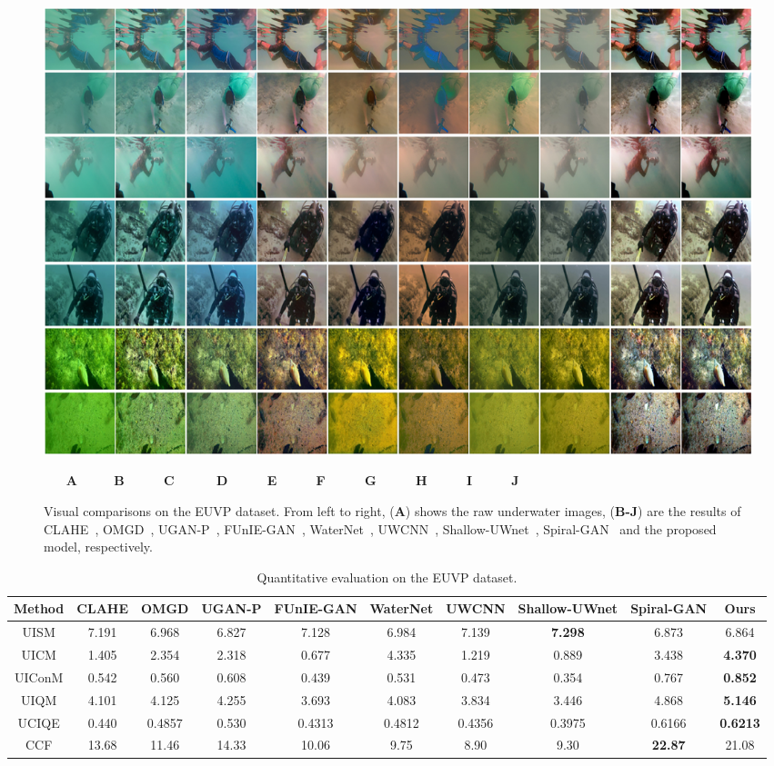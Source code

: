 \documentclass[utf8]{FrontiersinHarvard} %
\begin{document}
\begin{figure}[htbp]
\begin{center}
\includegraphics[width=1\textwidth]{FSpiralGAN_frontiers/onepicture/EUVP300.jpg}
\end{center}
$~~~~~~~~$\textbf{A}$~~~~~~~~~~~~~$\textbf{B}$~~~~~~~~~~~~~~$\textbf{C}$~~~~~~~~~~~~~~~$\textbf{D}$~~~~~~~~~~~~~~$\textbf{E}$~~~~~~~~~~~~~~$\textbf{F}$~~~~~~~~~~~~~~$\textbf{G}$~~~~~~~~~~~~~~$\textbf{H}$~~~~~~~~~~~~~~$\textbf{I}$~~~~~~~~~~~~~~$\textbf{J}
 \caption{{Visual comparisons on the EUVP dataset. From left to right, (\textbf{A}) shows the raw underwater images, (\textbf{B-J}) are the results of CLAHE~\citep{109340}, OMGD~\citep{ren2021online}, UGAN-P~\citep{8460552}, FUnIE-GAN~\citep{9001231}, WaterNet~\citep{8917818}, UWCNN~\citep{2019Underwater1}, Shallow-UWnet~\citep{naik2021shallow}, Spiral-GAN~\citep{2020Underwater} and the proposed model, respectively.}\label{fig:comparison-fgan}}
\end{figure}

\begin{table}[htbp]\small
\centering
\setlength\tabcolsep{3pt}
\caption{{Quantitative evaluation on the EUVP dataset.}}
\begin{tabular}{c|ccccccccc}
\hline  
Method&CLAHE&OMGD&UGAN-P&FUnIE-GAN&WaterNet&UWCNN&Shallow-UWnet&Spiral-GAN&Ours\\
\hline 
UISM&7.191&6.968&6.827&7.128&6.984&7.139&\textbf{7.298}&6.873&6.864\\
\hline 
UICM&1.405&2.354&2.318&0.677&4.335&1.219&0.889&3.438&\textbf{4.370}\\
\hline 
UIConM&0.542&0.560&0.608&0.439&0.531&0.473&0.354&0.767&\textbf{0.852}\\
\hline 
UIQM&4.101&4.125&4.255&3.693&4.083&3.834&3.446&4.868&\textbf{5.146}\\
\hline 
UCIQE&0.440&0.4857&0.530&0.4313&0.4812&0.4356&0.3975&0.6166&\textbf{0.6213}\\
\hline
CCF&13.68&11.46&14.33&10.06&9.75&8.90&9.30&\textbf{22.87}&21.08\\
\hline
\end{tabular}
\label{tbl:comparison-fgan}
\end{table}
\end{document}

